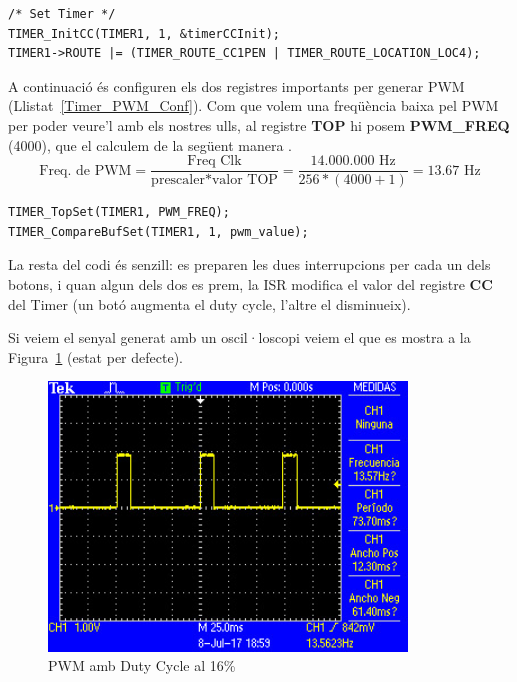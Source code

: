 \begin{lstlisting}[style=customc, label=Set_Timer_PWM, caption=Configuració del Timer per l'exemple PWM]
 /* Set Timer */
TIMER_InitCC(TIMER1, 1, &timerCCInit);
TIMER1->ROUTE |= (TIMER_ROUTE_CC1PEN | TIMER_ROUTE_LOCATION_LOC4);
\end{lstlisting}

A continuació és configuren els dos registres importants per generar PWM (Llistat~\ref {Timer_PWM_Conf}). Com que volem una freqüència baixa pel \gls{PWM} per poder veure'l amb els nostres ulls, al registre {\bf TOP} hi posem {\bf PWM\_FREQ} (4000), que el calculem de la següent manera \cite{EFM32GRM}.
\begin{displaymath}
\text{Freq. de PWM} = \frac{\text{Freq Clk}}{\text{prescaler} * \text{valor TOP}} = \frac{14.000.000 \text{ Hz}}{256 * (4000 +1 )} = 13.67 \text{ Hz}
\end{displaymath}

\begin{lstlisting}[style=customc, label=Timer_PWM_Conf, caption=Configuració del Timer per l'exemple PWM]
TIMER_TopSet(TIMER1, PWM_FREQ);
TIMER_CompareBufSet(TIMER1, 1, pwm_value);
\end{lstlisting}

La resta del codi és senzill: es preparen les dues interrupcions per cada un dels botons, i quan algun dels dos es prem, la \gls{ISR} modifica el valor del registre {\bf CC} del Timer (un botó augmenta el duty cycle, l'altre el disminueix).

Si veiem el senyal generat amb un oscil·loscopi veiem el que es mostra a la Figura~\ref{fig:DutyCycle1} (estat per defecte).
\begin{figure}
 \centering
 \includegraphics[width=0.85\textwidth, keepaspectratio]{imatges/DutyCycle1.png}
 \caption{PWM amb Duty Cycle al 16\%}
 \label{fig:DutyCycle1}
\end{figure}

